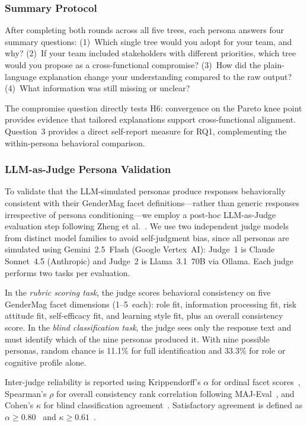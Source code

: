 \documentclass[sigconf,review]{acmart}
\begin{document}
\subsubsection{Summary Protocol}

After completing both rounds across all five trees, each persona answers
four summary questions: (1)~Which single tree would you adopt for your
team, and why? (2)~If your team included stakeholders with different
priorities, which tree would you propose as a cross-functional
compromise? (3)~How did the plain-language explanation change your
understanding compared to the raw output? (4)~What information was still
missing or unclear?

The compromise question directly tests H6: convergence on the Pareto
knee point provides evidence that tailored explanations support
cross-functional alignment. Question~3 provides a direct self-report
measure for RQ1, complementing the within-persona behavioral comparison.

\subsubsection{LLM-as-Judge Persona Validation}

To validate that the LLM-simulated personas produce responses
behaviorally consistent with their GenderMag facet definitions---rather
than generic responses irrespective of persona conditioning---we employ a
post-hoc LLM-as-Judge evaluation step following Zheng et
al.~\cite{zheng2023judging}. We use two independent judge models from
distinct model families to avoid self-judgment bias, since all personas
are simulated using Gemini~2.5~Flash (Google Vertex~AI): Judge~1 is
Claude Sonnet~4.5 (Anthropic) and Judge~2 is Llama~3.1~70B via Ollama.
Each judge performs two tasks per evaluation.

In the \textit{rubric scoring task}, the judge scores behavioral
consistency on five GenderMag facet dimensions (1--5~each): role fit,
information processing fit, risk attitude fit, self-efficacy fit, and
learning style fit, plus an overall consistency score. In the
\textit{blind classification task}, the judge sees only the response text
and must identify which of the nine personas produced it. With nine
possible personas, random chance is 11.1\% for full identification and
33.3\% for role or cognitive profile alone.

Inter-judge reliability is reported using Krippendorff's $\alpha$ for
ordinal facet scores~\cite{krippendorff2019content}, Spearman's $\rho$
for overall consistency rank correlation following
MAJ-Eval~\cite{chen2025multiagent}, and Cohen's $\kappa$ for blind
classification agreement~\cite{cohen1960coefficient}. Satisfactory
agreement is defined as $\alpha \geq 0.80$~\cite{marzi2024kalpha} and
$\kappa \geq 0.61$~\cite{landis1977measurement}.
\end{document}
